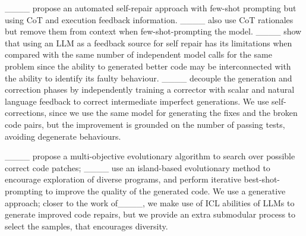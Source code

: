 ____ propose an automated self-repair approach with few-shot prompting but using CoT and execution feedback information. ____ also use CoT rationales but remove them from context when few-shot-prompting the model. ____ show that using an LLM as a feedback source for self repair has its limitations when compared with the same number of independent model calls for the same problem since the ability to generated better code may be interconnected with the ability to identify its faulty behaviour. ____ decouple the generation and correction phases by independently training a corrector with scalar and natural language feedback to correct intermediate imperfect generations. We use self-corrections, since we use the same model for generating the fixes and the broken code pairs, but the improvement is grounded on the number of passing tests, avoiding degenerate behaviours.


____ propose a multi-objective evolutionary algorithm to search over possible correct code patches; ____ use an island-based evolutionary method to encourage exploration of diverse programs, and perform iterative best-shot-prompting to improve the quality of the generated code. We use a generative approach; closer to the work of____, we make use of ICL abilities of LLMs to generate improved code repairs, but we provide an extra submodular process to select the samples, that encourages diversity.